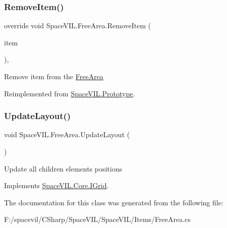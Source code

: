 \subsubsection{\texorpdfstring{Remove\+Item()}{RemoveItem()}}
{\footnotesize\ttfamily override void Space\+V\+I\+L.\+Free\+Area.\+Remove\+Item (\begin{DoxyParamCaption}\item[{\mbox{\hyperlink{interface_space_v_i_l_1_1_core_1_1_i_base_item}{I\+Base\+Item}}}]{item }\end{DoxyParamCaption})\hspace{0.3cm}{\ttfamily [inline]}, {\ttfamily [virtual]}}



Remove item from the \mbox{\hyperlink{class_space_v_i_l_1_1_free_area}{Free\+Area}} 



Reimplemented from \mbox{\hyperlink{class_space_v_i_l_1_1_prototype_a7a2aabccfe6389f71d0265fa73f0ae87}{Space\+V\+I\+L.\+Prototype}}.

\mbox{\label{class_space_v_i_l_1_1_free_area_a88f3dc2645275f25f2fae769e7a1423a}} 
\subsubsection{\texorpdfstring{Update\+Layout()}{UpdateLayout()}}
{\footnotesize\ttfamily void Space\+V\+I\+L.\+Free\+Area.\+Update\+Layout (\begin{DoxyParamCaption}{ }\end{DoxyParamCaption})\hspace{0.3cm}{\ttfamily [inline]}}



Update all children elements positions 



Implements \mbox{\hyperlink{interface_space_v_i_l_1_1_core_1_1_i_grid}{Space\+V\+I\+L.\+Core.\+I\+Grid}}.



The documentation for this class was generated from the following file\+:\begin{DoxyCompactItemize}
\item 
F\+:/spacevil/\+C\+Sharp/\+Space\+V\+I\+L/\+Space\+V\+I\+L/\+Items/Free\+Area.\+cs\end{DoxyCompactItemize}
